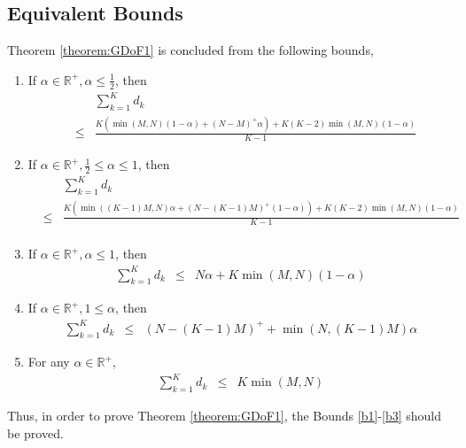 \documentclass[11pt]{article}
\begin{document}
\subsection{Equivalent Bounds}
Theorem \ref{theorem:GDoF1} is concluded from the following bounds,
\begin{enumerate}
\item If $\alpha\in\mathbb{R}^+,\alpha\le\frac{1}{2}$, then 
\begin{eqnarray}
&&\sum_{k=1}^Kd_k\nonumber\\
&\le& \frac{K\left(\min(M,N)(1-\alpha)+(N-M)^+\alpha\right)+K(K-2)\min(M,N)(1-\alpha)}{K-1}\label{b1}
\end{eqnarray}
\item If $\alpha\in\mathbb{R}^+,\frac{1}{2}\le\alpha\le1$, then 
\begin{eqnarray}
&&\sum_{k=1}^Kd_k\nonumber\\
&\le& \frac{K\left(\min((K-1)M,N)\alpha+(N-(K-1)M)^+(1-\alpha)\right)+K(K-2)\min(M,N)(1-\alpha)}{K-1}\nonumber\\
&&\label{b1+}
\end{eqnarray}
\item If $\alpha\in\mathbb{R}^+,\alpha\le1$, then 
\begin{eqnarray}
\sum_{k=1}^Kd_k&\le& N\alpha+K\min(M,N)(1-\alpha)\label{b2}
\end{eqnarray}
\item If $\alpha\in\mathbb{R}^+,1\le\alpha$, then 
\begin{eqnarray}
\sum_{k=1}^Kd_k&\le& (N-(K-1)M)^++\min(N,(K-1)M)\alpha\label{b2+}
\end{eqnarray}
\item For any $\alpha\in \mathbb{R}^+$, 
\begin{eqnarray}
\sum_{k=1}^Kd_k&\le& K\min(M,N)\label{b3}
\end{eqnarray}
\end{enumerate}
Thus, in order to prove Theorem \ref{theorem:GDoF1}, the Bounds \eqref{b1}-\eqref{b3} should be proved.
\end{document}
